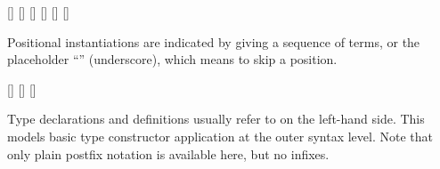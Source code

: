 \begin{isabellebody}
\begin{isamarkuptext}
  \begin{railoutput}
\rail@bar
{}[]
[]
[]
\rail@endbar
\rail@end
{}
\rail@bar
{}[]
[]
\rail@endbar
\rail@end
{}
[]
\rail@end
\end{railoutput}


  Positional instantiations are indicated by giving a sequence of
  terms, or the placeholder ``'' (underscore), which means to
  skip a position.

  \begin{railoutput}
\rail@bar
{}[]
[]
\rail@endbar
\rail@end
{}
\rail@plus
{}
[]
\rail@endplus
\rail@end
\end{railoutput}


  Type declarations and definitions usually refer to \hyperlink{syntax.typespec}{\mbox{}} on the left-hand side.  This models basic type constructor
  application at the outer syntax level.  Note that only plain postfix
  notation is available here, but no infixes.


\end{isamarkuptext}
\end{isabellebody}

